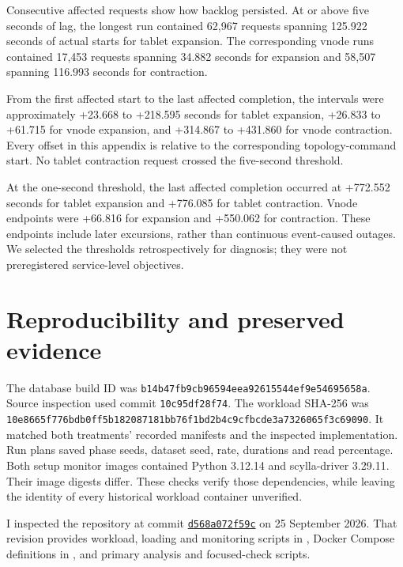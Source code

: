 Consecutive affected requests show how backlog persisted. At or above five seconds of lag, the longest run contained 62,967 requests spanning 125.922 seconds of actual starts for tablet expansion. The corresponding vnode runs contained 17,453 requests spanning 34.882 seconds for expansion and 58,507 spanning 116.993 seconds for contraction.

From the first affected start to the last affected completion, the intervals were approximately +23.668 to +218.595 seconds for tablet expansion, +26.833 to +61.715 for vnode expansion, and +314.867 to +431.860 for vnode contraction. Every offset in this appendix is relative to the corresponding topology-command start. No tablet contraction request crossed the five-second threshold.

At the one-second threshold, the last affected completion occurred at +772.552 seconds for tablet expansion and +776.085 for tablet contraction. Vnode endpoints were +66.816 for expansion and +550.062 for contraction. These endpoints include later excursions, rather than continuous event-caused outages. We selected the thresholds retrospectively for diagnosis; they were not preregistered service-level objectives.

\newpage

\hypertarget{reproducibility-and-preserved-evidence}{%
\section{Reproducibility and preserved
evidence}\label{reproducibility-and-preserved-evidence}}

The database build ID was \nolinkurl{b14b47fb9cb96594eea92615544ef9e54695658a}. Source inspection used commit \texttt{10c95df28f74}. The workload SHA-256 was \nolinkurl{10e8665f776bdb0ff5b182087181bb76f1bd2b4c9cfbcde3a7326065f3c69090}. It matched both treatments' recorded manifests and the inspected implementation. Run plans saved phase seeds, dataset seed, rate, durations and read percentage. Both setup monitor images contained Python 3.12.14 and scylla-driver 3.29.11. Their image digests differ. These checks verify those dependencies, while leaving the identity of every historical workload container unverified.

I inspected the repository \cite{r35} at commit \href{https://github.com/GiorgiGogsadze/Scylla-Research/tree/d568a072f59c9439bcf6a3dea65923b50214a19f}{\texttt{d568a072f59c}} on 25 September 2026. That revision provides workload, loading and monitoring scripts in , Docker Compose definitions in , and primary analysis and focused-check scripts.

